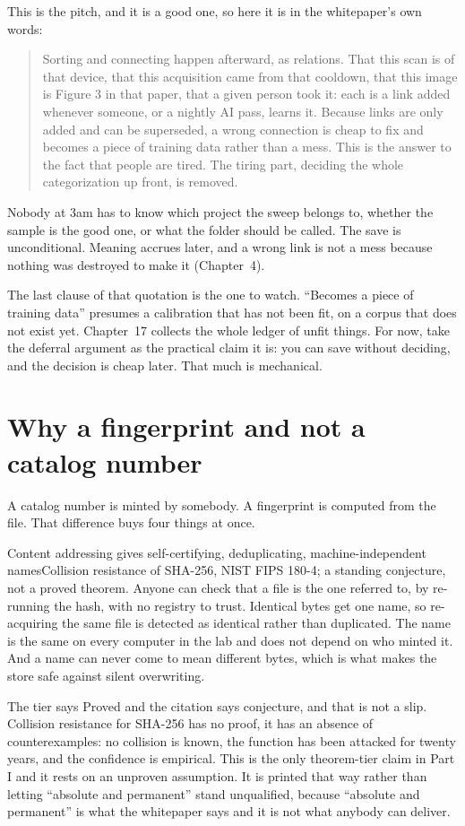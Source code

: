 This is the pitch, and it is a good one, so here it is in the whitepaper's own words:

\begin{quote}
Sorting and connecting happen afterward, as relations. That this scan is of that device, that this acquisition came from that cooldown, that this image is Figure 3 in that paper, that a given person took it: each is a link added whenever someone, or a nightly AI pass, learns it. Because links are only added and can be superseded, a wrong connection is cheap to fix and becomes a piece of training data rather than a mess. This is the answer to the fact that people are tired. The tiring part, deciding the whole categorization up front, is removed.
\end{quote}

Nobody at 3am has to know which project the sweep belongs to, whether the sample is the good one, or what the folder should be called. The save is unconditional. Meaning accrues later, and a wrong link is not a mess because nothing was destroyed to make it (Chapter~4).

The last clause of that quotation is the one to watch. ``Becomes a piece of training data'' presumes a calibration that has not been fit, on a corpus that does not exist yet. Chapter~17 collects the whole ledger of unfit things. For now, take the deferral argument as the practical claim it is: you can save without deciding, and the decision is cheap later. That much is mechanical.

\section{Why a fingerprint and not a catalog number}

A catalog number is minted by somebody. A fingerprint is computed from the file. That difference buys four things at once.

\begin{Theorem}{Content addressing gives self-certifying, deduplicating, machine-independent names}{Collision resistance of SHA-256, NIST FIPS 180-4; a standing conjecture, not a proved theorem.}
Anyone can check that a file is the one referred to, by re-running the hash, with no registry to trust. Identical bytes get one name, so re-acquiring the same file is detected as identical rather than duplicated. The name is the same on every computer in the lab and does not depend on who minted it. And a name can never come to mean different bytes, which is what makes the store safe against silent overwriting.

The tier says Proved and the citation says conjecture, and that is not a slip. Collision resistance for SHA-256 has no proof, it has an absence of counterexamples: no collision is known, the function has been attacked for twenty years, and the confidence is empirical. This is the only theorem-tier claim in Part I and it rests on an unproven assumption. It is printed that way rather than letting ``absolute and permanent'' stand unqualified, because ``absolute and permanent'' is what the whitepaper says and it is not what anybody can deliver.
\end{Theorem}


